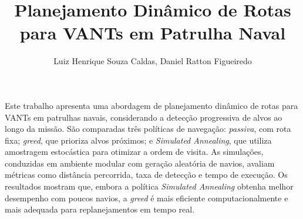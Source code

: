 \documentclass[12pt]{article}
\title{Planejamento Dinâmico de Rotas para VANTs em Patrulha Naval}
\author{Luiz Henrique Souza Caldas\inst{1}, Daniel Ratton Figueiredo\inst{1}}
\begin{document}
 

\maketitle

     
\begin{resumo} 
Este trabalho apresenta uma abordagem de planejamento dinâmico de rotas para VANTs em patrulhas navais, considerando a detecção progressiva de alvos ao longo da missão. São comparadas três políticas de navegação: \textit{passiva}, com rota fixa; \textit{greed}, que prioriza alvos próximos; e \textit{Simulated Annealing}, que utiliza amostragem estocástica para otimizar a ordem de visita. As simulações, conduzidas em ambiente modular com geração aleatória de navios, avaliam métricas como distância percorrida, taxa de detecção e tempo de execução. Os resultados mostram que, embora a política \textit{Simulated Annealing} obtenha melhor desempenho com poucos navios, a \textit{greed} é mais eficiente computacionalmente e mais adequada para replanejamentos em tempo real.
\end{resumo}










\end{document}
